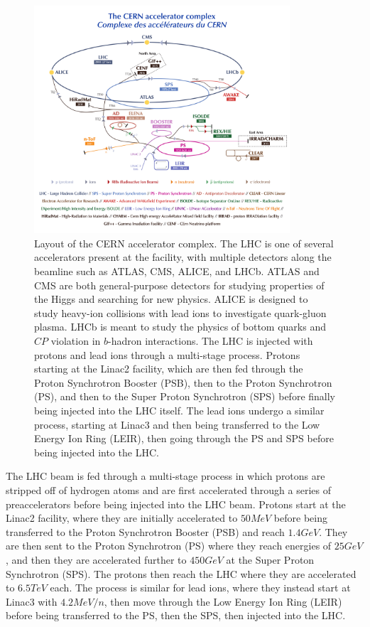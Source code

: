 \begin{figure}[htbp]
  \centering
  \includegraphics[width=0.85\textwidth]{fig/experiment/CCC-v2018-print-v2.pdf}
  \caption{
    Layout of the CERN accelerator complex.
    The LHC is one of several accelerators present at the facility, with multiple detectors along the beamline such as ATLAS, CMS, ALICE, and LHCb.
    ATLAS and CMS are both general-purpose detectors for studying properties of the Higgs and searching for new physics.
    ALICE is designed to study heavy-ion collisions with lead ions to investigate quark-gluon plasma.
    LHCb is meant to study the physics of bottom quarks and $CP$ violation in $b$-hadron interactions.
    The LHC is injected with protons and lead ions through a multi-stage process.
    Protons starting at the Linac2 facility, which are then fed through the Proton Synchrotron Booster (PSB), then to the Proton Synchrotron (PS), and then to the Super Proton Synchrotron (SPS) before finally being injected into the LHC itself.
    The lead ions undergo a similar process, starting at Linac3 and then being transferred to the Low Energy Ion Ring (LEIR), then going through the PS and SPS before being injected into the LHC.
  }
  \label{fig:CERN}
\end{figure}

The LHC beam is fed through a multi-stage process in which protons are stripped off of hydrogen atoms and are first accelerated through a series of preaccelerators before being injected into the LHC beam.
Protons start at the Linac2 facility, where they are initially accelerated to $50\unit{MeV}$ before being transferred to the Proton Synchrotron Booster (PSB) and reach $1.4\unit{GeV}$.
They are then sent to the Proton Synchrotron (PS) where they reach energies of $25\unit{GeV}$, and then they are accelerated further to $450\unit{GeV}$ at the Super Proton Synchrotron (SPS).
The protons then reach the LHC where they are accelerated to $6.5\unit{TeV}$ each.
The process is similar for lead ions, where they instead start at Linac3 with $4.2\unit{MeV/n}$, then move through the Low Energy Ion Ring (LEIR) before being transferred to the PS, then the SPS, then injected into the LHC.

